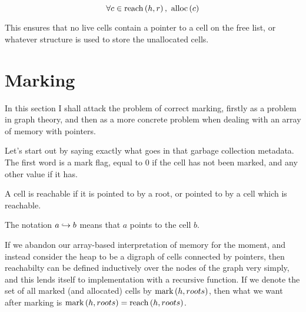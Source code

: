 \begin{definition}
  \label{def:ms-live-cell-invariant}
  \[\forall c \in \reach{h}{r},\ \alloc{c}\]
\end{definition}

This ensures that no live cells contain a pointer to a cell on the
free list, or whatever structure is used to store the unallocated
cells.

\section{Marking}
\label{sec:marksweep-marking}

In this section I shall attack the problem of correct marking, firstly
as a problem in graph theory, and then as a more concrete problem when
dealing with an array of memory with pointers.

Let's start out by saying exactly what goes in that \gls{garbage
  collection} metadata. The first word is a mark flag, equal to 0 if
the \gls{cell} has not been marked, and any other value if it has.

\begin{definition}[Reachable]
  \label{def:ms-reachable}
  A cell is reachable if it is pointed to by a root, or pointed to by
  a cell which is reachable.

  \begin{minipage}{.5\textwidth}
    \begin{prooftree}
    \end{prooftree}
  \end{minipage}
  \begin{minipage}{.5\textwidth}
    \begin{prooftree}
    \end{prooftree}
  \end{minipage}

  The notation $a \pointsto b$ means that $a$ points to the cell $b$.
\end{definition}

If we abandon our array-based interpretation of memory for the moment,
and instead consider the \gls{heap} to be a digraph of \glspl{cell}
connected by \glspl{pointer}, then reachabilty can be defined
inductively over the nodes of the graph very simply, and this lends
itself to implementation with a recursive function. If we denote the
set of all marked (and allocated) cells by $\markset{h}{roots}$, then
what we want after marking is $\markset{h}{roots} = \reach{h}{roots}$.

